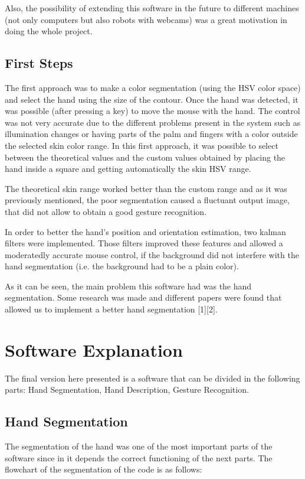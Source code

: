 \documentclass{article}
\begin{document}
Also, the possibility of extending this software in the future to different machines (not only computers but also robots with webcams) was a great motivation in doing the whole project. 


\subsection{First Steps}
The first approach was to make a color segmentation (using the HSV color space) and select the hand using the size of the contour. Once the hand was detected, it was possible (after pressing a key) to move the mouse with the hand. The control was not very accurate due to the different problems present in the system such as illumination changes or having parts of the palm and fingers with a color outside the selected skin color range. In this first approach, it was possible to select between the theoretical values and the custom values obtained by placing the hand inside a square and getting automatically the skin HSV range. 

The theoretical skin range worked better than the custom range and as it was previously mentioned, the poor segmentation caused a fluctuant output image, that did not allow to obtain a good gesture recognition.   

In order to better the hand's position and orientation estimation, two kalman filters were implemented. Those filters improved these features and allowed a moderatedly accurate mouse control, if the background did not interfere with the hand segmentation (i.e. the background had to be a plain color). 

As it can be seen, the main problem this software had was the hand segmentation. Some research was made and different papers were found that allowed us to implement a better hand segmentation [1][2]. 


  
\section{Software Explanation}

The final version here presented is a software that can be divided in the following parts: Hand Segmentation, Hand Description, Gesture Recognition.
\subsection{Hand Segmentation}
The segmentation of the hand was one of the most important parts of the software since in it depends the correct functioning of the next parts. 
The flowchart of the segmentation of the code is as follows: 
\end{document}
